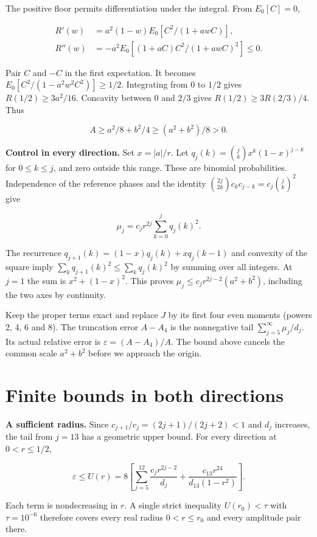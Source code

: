 The positive floor permits differentiation under the integral. From \(E_0[C]=0\),

\[
\begin{aligned}
R'(w)&=a^2(1-w)E_0[C^2/(1+awC)],\\
R''(w)&=-a^2 E_0[(1+aC)C^2/(1+awC)^2]\le0 .
\end{aligned}
\]

Pair \(C\) and \(-C\) in the first expectation. It becomes \(E_0[C^2/(1-a^2w^2C^2)]\ge1/2\). Integrating from 0 to \(1/2\) gives \(R(1/2)\ge3a^2/16\). Concavity between 0 and \(2/3\) gives \(R(1/2)\ge3R(2/3)/4\). Thus

\[
A\ge a^2/8+b^2/4\ge(a^2+b^2)/8>0 .
\]

\textbf{Control in every direction.} Set \(x=|a|/r\). Let \(q_j(k)=\binom{j}{k}x^k(1-x)^{j-k}\) for \(0\le k\le j\), and zero outside this range. These are binomial probabilities. Independence of the reference phases and the identity \(\binom{2j}{2k}c_kc_{j-k}=c_j\binom{j}{k}^2\) give

\[
\mu_j=c_j r^{2j}\sum_{k=0}^{j}q_j(k)^2.
\]

The recurrence \(q_{j+1}(k)=(1-x)q_j(k)+xq_j(k-1)\) and convexity of the square imply \(\sum_k q_{j+1}(k)^2\le\sum_k q_j(k)^2\) by summing over all integers. At \(j=1\) the sum is \(x^2+(1-x)^2\). This proves \(\mu_j\le c_j r^{2j-2}(a^2+b^2)\), including the two axes by continuity.

Keep the proper terms exact and replace \(J\) by its first four even moments (powers 2, 4, 6 and 8). The truncation error \(A-A_4\) is the nonnegative tail \(\sum_{j=5}^{\infty}\mu_j/d_j\). Its actual relative error is \(\varepsilon=(A-A_4)/A\). The bound above cancels the common scale \(a^2+b^2\) before we approach the origin.

\clearpage

\section{Finite bounds in both directions}\label{finite-bounds-in-both-directions}

\textbf{A sufficient radius.} Since \(c_{j+1}/c_j=(2j+1)/(2j+2)<1\) and \(d_j\) increases, the tail from \(j=13\) has a geometric upper bound. For every direction at \(0<r\le1/2\),

\[
\varepsilon\le U(r)=8\left[\sum_{j=5}^{12}\frac{c_jr^{2j-2}}{d_j}
 +\frac{c_{13}r^{24}}{d_{13}(1-r^2)}\right].
\]

Each term is nondecreasing in \(r\). A single strict inequality \(U(r_0)<\tau\) with \(\tau=10^{-6}\) therefore covers every real radius \(0<r\le r_0\) and every amplitude pair there.

